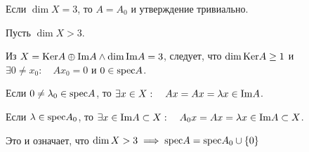 Если $\dim X = 3$, то $A = A_0$ и утверждение тривиально.

Пусть $\dim X > 3$.

Из $X = \mathrm{Ker} A \oplus \mathrm{Im} A \land \dim\mathrm{Im} A=3$,
следует, что $\dim\mathrm{Ker} A \geq 1$ и $\exists 0\neq x_0: \quad A x_0 = 0$ и $0\in\mathrm{spec} A$.

Если $0\neq\lambda_0\in\mathrm{spec} A$,
то $\exists x\in X: \quad A x = A x = \lambda x\in\mathrm{Im} A$.

Если $\lambda\in\mathrm{spec} A_0$,
то $\exists x\in\mathrm{Im} A\subset X: \quad A_0 x = A x = \lambda x\in\mathrm{Im} A\subset X$.

Это и означает, что $\dim X > 3 \implies \mathrm{spec} A = \mathrm{spec} A_0 \cup \{0\}$
